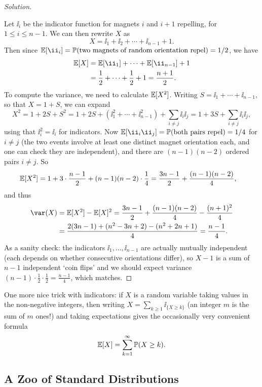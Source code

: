 \documentclass[a4paper]{scrartcl}
\begin{document}
\begin{proof}[Solution]
\begin{center}
	\end{center}
	Let $\ii_i$ be the indicator function for magnets $i$ and $i+1$ repelling, for $1 \leq i \leq n - 1$. We can then rewrite $X$ as 
	$$
	X = \ii_1 + \ii_2 + \cdots + \ii_{n - 1} + 1.
	$$
	Then since $\EE[\ii_i] = \PP(\text{two magnets of random orientation repel}) = 1/2$, we have
	\begin{align*}
		\EE[X] &= \EE[\ii_1] + \cdots + \EE[\ii_{n - 1}] + 1\\
		&= \frac{1}{2} + \cdots + \frac{1}{2} + 1 = \frac{n + 1}{2}.
	\end{align*}
	To compute the variance, we need to calculate $\mathbb{E}[X^2]$. Writing $S = \ii_1 + \cdots + \ii_{n-1}$, so that $X = 1 + S$, we can expand
	$$
	X^2 = 1 + 2S + S^2 = 1 + 2S + (\ii_1^2 + \cdots + \ii_{n-1}^2) + \sum_{i \neq j} \ii_i \ii_j = 1 + 3S + \sum_{i \neq j} \ii_i \ii_j,
	$$
	using that $\ii_i^2 = \ii_i$ for indicators. Now $\EE[\ii_i \ii_j] = \PP(\text{both pairs repel}) = 1/4$ for $i \neq j$ (the two events involve at least one distinct magnet orientation each, and one can check they are independent), and there are $(n-1)(n-2)$ ordered pairs $i \neq j$. So
	\begin{align*}
		\mathbb{E}[X^2] &= 1 + 3 \cdot \frac{n - 1}{2} + (n - 1)(n - 2)\cdot\frac{1}{4} = \frac{3n - 1}{2} + \frac{(n-1)(n-2)}{4},
	\end{align*}
	and thus
	\begin{align*}
		\var(X) &= \EE[X^2] - \EE[X]^2 = \frac{3n - 1}{2} + \frac{(n-1)(n-2)}{4} - \frac{(n + 1)^2}{4} \\
		&= \frac{2(3n - 1) + (n^2 - 3n + 2) - (n^2 + 2n + 1)}{4} = \frac{n - 1}{4}.
	\end{align*}
	As a sanity check: the indicators $\ii_1, \dots, \ii_{n-1}$ are actually mutually independent (each depends on whether consecutive orientations differ), so $X - 1$ is a sum of $n - 1$ independent `coin flips' and we should expect variance $(n-1) \cdot \frac{1}{2} \cdot \frac{1}{2} = \frac{n-1}{4}$, which matches.
\end{proof}

One more nice trick with indicators: if $X$ is a random variable taking values in the non-negative integers, then writing $X = \sum_{k \geq 1} \ii_{\{X \geq k\}}$ (an integer $m$ is the sum of $m$ ones!) and taking expectations gives the occasionally very convenient formula
$$
\mathbb{E}[X] = \sum_{k = 1}^{\infty} \mathbb{P}(X \geq k).
$$

\subsection{A Zoo of Standard Distributions}
\end{document}
